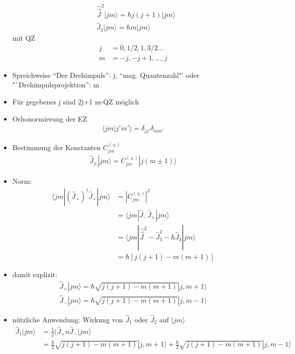 \documentclass[10pt,article,colorback,accentcolor=tud9d]{scrartcl}
\begin{document}
\begin{itemize}
  \begin{align}
   &\hat{\vec{J}}^2|jm\rangle=\hbar j(j+1)|jm\rangle\\
   &\hat{J}_3|jm\rangle=\hbar m |jm\rangle
  \end{align}
  mit QZ
  \begin{align}
   j&=0,1/2,1,3/2...\\
   m&=-j,-j+1,...,j
  \end{align}
\item Spreichweise ``Der Drehimpuls'': j, ``mag. Quantenzahl"' oder "`Drehimpulsprojektion'': m
\item Für gegebenes j sind 2j+1 m-QZ möglich
\item Orhonormierung der EZ
\begin{align}
 \langle jm|j'm'\rangle=\delta_{jj'}\delta_{mm'}
\end{align}
\item Bestimmung der Konstanten $C_{jm}^{(\pm)}$
\begin{align}
 \hat{J}_\pm|jm\rangle=C_{jm}^{(\pm)}|j(m\pm1)\rangle
\end{align}
\item Norm:
\begin{align}
\langle jm|(\hat{J}_+)^\dagger\hat{J}_+|jm\rangle&=|C_{jm}^{(\pm)}|^2\\
&=\langle jm|\hat{J}_-\hat{J}_+|jm\rangle\\
&=\langle jm|\hat{\vec{J}}^2-\hat{J}_3^2-\hbar\hat{J}_3|jm\rangle\\
&=\hbar[j(j+1)-m(m+1)]
\end{align}
  \item damit explizit:
    \begin{align}
    \hat{J}_+|jm\rangle=\hbar\sqrt{j(j+1)-m(m+1)}|j,m+1\rangle\\
    \hat{J}_-|jm\rangle=\hbar\sqrt{j(j+1)-m(m+1)}|j,m-1\rangle
    \end{align}
  \item nützliche Anwendung: Wirkung von $\hat{J}_1$ oder $\hat{J}_2$ auf $|jm\rangle$
    \begin{align}
    \hat{J}_1|jm\rangle&=\frac{1}{2}(\hat{J}_+n\hat{J}_-|jm\rangle\\
    &=\frac{\hbar}{2}\sqrt{j(j+1)-m(m+1)}|j,m+1\rangle+\frac{\hbar}{2}\sqrt{j(j+1)-m(m+1)}|j,m-1\rangle
    \end{align}
\end{itemize}
\end{document}
